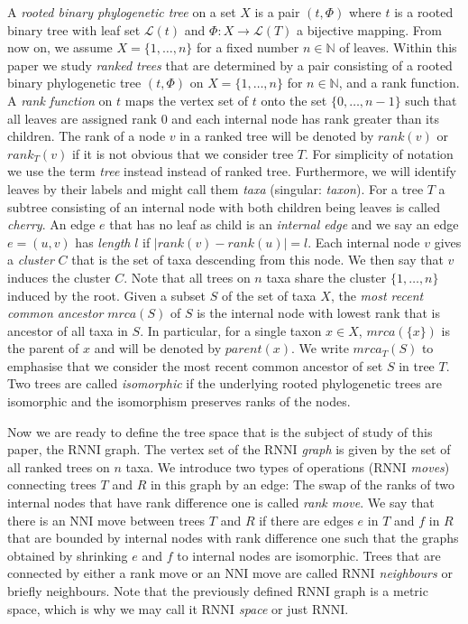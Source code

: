 \documentclass[11pt, a4paper]{article}
\newcommand{\nni}{\mathrm{NNI}}
\newcommand{\rnni}{\mathrm{RNNI}}
\begin{document}
A \emph{rooted binary phylogenetic tree} on a set $X$ is a pair $(t, \Phi)$ where $t$ is a rooted binary tree with leaf set $\mathcal{L}(t)$ and $\Phi:X \to \mathcal{L}(T)$ a bijective mapping. 
From now on, we assume $X = \{1,\ldots,n\}$ for a fixed number $n \in \mathbb N$ of leaves.
Within this paper we study \emph{ranked trees} that are determined by a pair consisting of a rooted binary phylogenetic tree $(t, \Phi)$ on $X = \{1, \ldots, n\}$ for $n \in \mathbb N$, and a rank function.
A \emph{rank function} on $t$ maps the vertex set of $t$ onto the set $\{0,\ldots,n-1\}$ such that all leaves are assigned rank $0$ and each internal node has rank greater than its children.
The rank of a node $v$ in a ranked tree will be denoted by $rank(v)$ or $rank_T(v)$ if it is not obvious that we consider tree $T$.
For simplicity of notation we use the term \emph{tree} instead instead of ranked tree.
Furthermore, we will identify leaves by their labels and might call them \emph{taxa} (singular: \emph{taxon}).
For a tree $T$ a subtree consisting of an internal node with both children being leaves is called \emph{cherry}.
An edge $e$ that has no leaf as child is an \emph{internal edge} and we say an edge $e=(u,v)$ has \emph{length} $l$ if $|rank(v) - rank(u)| = l$.
Each internal node $v$ gives a \emph{cluster} $C$ that is the set of taxa descending from this node. 
We then say that $v$ induces the cluster $C$.
Note that all trees on $n$ taxa share the cluster $\{1,\ldots,n\}$ induced by the root.
Given a subset $S$ of the set of taxa $X$, the \emph{most recent common ancestor} $mrca(S)$ of $S$ is the internal node with lowest rank that is ancestor of all taxa in $S$. 
In particular, for a single taxon $x \in X$, $mrca(\{x\})$ is the parent of $x$ and will be denoted by $parent(x)$.
We write $mrca_T(S)$ to emphasise that we consider the most recent common ancestor of set $S$ in tree $T$.
Two trees are called \emph{isomorphic} if the underlying rooted phylogenetic trees are isomorphic and the isomorphism preserves ranks of the nodes.


Now we are ready to define the tree space that is the subject of study of this paper, the $\rnni$ graph.
The vertex set of the \emph{$\rnni$ graph} is given by the set of all ranked trees on $n$ taxa.
We introduce two types of operations (\emph{$\rnni$ moves}) connecting trees $T$ and $R$ in this graph by an edge:
The swap of the ranks of two internal nodes that have rank difference one is called \emph{rank move}.
We say that there is an $\nni$ move between trees $T$ and $R$ if there are edges $e$ in $T$ and $f$ in $R$ that are bounded by internal nodes with rank difference one such that the graphs obtained by shrinking $e$ and $f$ to internal nodes are isomorphic.
Trees that are connected by either a rank move or an $\nni$ move are called \emph{$\rnni$ neighbours} or briefly neighbours.
Note that the previously defined $\rnni$ graph is a metric space, which is why we may call it \emph{$\rnni$ space} or just $\rnni$.
\end{document}

